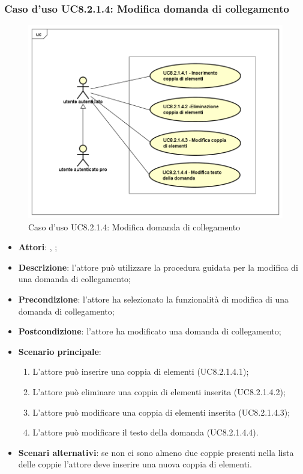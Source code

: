 \subsubsection{Caso d'uso UC8.2.1.4: Modifica domanda di collegamento}
\label{UC8.2.1.4}
\begin{figure}[h]
	\centering
	\includegraphics[scale=0.5,keepaspectratio]{UML/UC8_2_1_4.png}
	\caption{Caso d'uso UC8.2.1.4: Modifica domanda di collegamento}
\end{figure}
\FloatBarrier
\begin{itemize}
	\item \textbf{Attori}: \uau, \uaupro;
	\item \textbf{Descrizione}: l'attore può utilizzare la procedura guidata per la modifica di una domanda di collegamento; 
	\item \textbf{Precondizione}: l'attore ha selezionato la funzionalità di modifica di una domanda di collegamento; 
	\item \textbf{Postcondizione}: l'attore ha modificato una domanda di collegamento;
	\item \textbf{Scenario principale}: 
	\begin{enumerate}
			\item L'attore può inserire una coppia di elementi (UC8.2.1.4.1);
			\item L'attore può eliminare una coppia di elementi inserita (UC8.2.1.4.2);
			\item L'attore può modificare una coppia di elementi inserita (UC8.2.1.4.3);
			\item L'attore può modificare il testo della domanda (UC8.2.1.4.4).
		\end{enumerate}
	\item \textbf{Scenari alternativi}: se non ci sono almeno due coppie presenti nella lista delle coppie l'attore deve inserire una nuova coppia di elementi.
\end{itemize}

